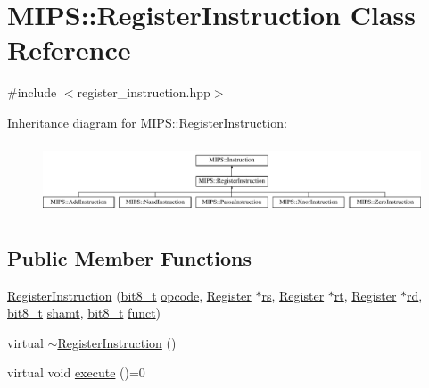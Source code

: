 \hypertarget{classMIPS_1_1RegisterInstruction}{}\section{M\+I\+PS\+:\+:Register\+Instruction Class Reference}
\label{classMIPS_1_1RegisterInstruction}


{\ttfamily \#include $<$register\+\_\+instruction.\+hpp$>$}

Inheritance diagram for M\+I\+PS\+:\+:Register\+Instruction\+:\begin{figure}[H]
\begin{center}
\leavevmode
\includegraphics[height=2.100000cm]{classMIPS_1_1RegisterInstruction}
\end{center}
\end{figure}
\subsection*{Public Member Functions}
\begin{DoxyCompactItemize}
\item 
\hyperlink{classMIPS_1_1RegisterInstruction_a045e405b2686a05e3173724582e79944}{Register\+Instruction} (\hyperlink{core_8hpp_a6074bae122ae7b527864eec42c728c3c}{bit8\+\_\+t} \hyperlink{classMIPS_1_1Instruction_a45cc6808b5dde8a5d41067d148b55476}{opcode}, \hyperlink{classMIPS_1_1Register}{Register} $\ast$\hyperlink{classMIPS_1_1RegisterInstruction_ac901daa914a523f2725e69ffc1fa6982}{rs}, \hyperlink{classMIPS_1_1Register}{Register} $\ast$\hyperlink{classMIPS_1_1RegisterInstruction_af6f209ae3da38c3b58c8791837217c07}{rt}, \hyperlink{classMIPS_1_1Register}{Register} $\ast$\hyperlink{classMIPS_1_1RegisterInstruction_a440089aa8e302ded14fbccfcb6cd5d4f}{rd}, \hyperlink{core_8hpp_a6074bae122ae7b527864eec42c728c3c}{bit8\+\_\+t} \hyperlink{classMIPS_1_1RegisterInstruction_a92e140a46c42d4ece7a1b497f9228fdc}{shamt}, \hyperlink{core_8hpp_a6074bae122ae7b527864eec42c728c3c}{bit8\+\_\+t} \hyperlink{classMIPS_1_1RegisterInstruction_a1e26d32655594e99cbfc576c73ae4f94}{funct})
\item 
virtual \hyperlink{classMIPS_1_1RegisterInstruction_a64d533ccc487a60099947e0891be1ff8}{$\sim$\+Register\+Instruction} ()
\item 
virtual void \hyperlink{classMIPS_1_1RegisterInstruction_a4e1c8051158926465f93a256122a8eee}{execute} ()=0
\end{DoxyCompactItemize}
